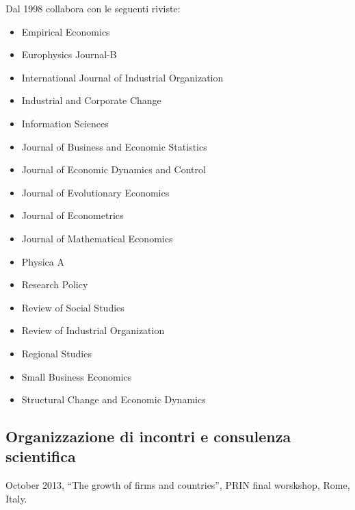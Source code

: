 \documentclass[a4paper]{article}
\begin{document}
Dal 1998 collabora con le seguenti riviste:
%
\begin{itemize}

\item Empirical Economics

\item Europhysics Journal-B

\item International Journal of Industrial Organization

\item Industrial and Corporate Change

\item Information Sciences

\item Journal of Business and Economic Statistics

\item Journal of Economic Dynamics and Control

\item Journal of Evolutionary Economics

\item Journal of Econometrics

\item Journal of Mathematical Economics

\item Physica A

\item Research Policy

\item Review of Social Studies

\item Review of Industrial Organization

\item Regional Studies

\item Small Business Economics

\item Structural Change and Economic Dynamics

\end{itemize}


\subsection{Organizzazione di incontri e consulenza scientifica%
  \label{organizzazione-di-incontri-e-consulenza-scientifica}%
}

October 2013, ``The growth of firms and countries'', PRIN final
worskshop, Rome, Italy.
\end{document}
